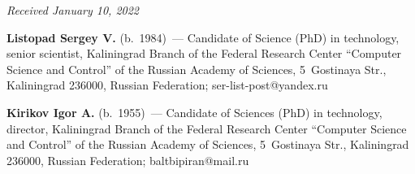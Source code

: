 \vspace*{-6pt}

\hfill{\small\textit{Received January 10, 2022}}


   
   \Contr
   
   \noindent
   \textbf{Listopad Sergey V.} (b.\ 1984)~--- Candidate of Science (PhD) in technology, senior 
scientist, Kaliningrad Branch of the Federal Research Center ``Computer Science and Control'' of 
the Russian Academy of Sciences, 5~Gostinaya Str., Kaliningrad 236000, Russian Federation;  
\mbox{ser-list-post@yandex.ru}
   
   \vspace*{3pt}
   
   \noindent
   \textbf{Kirikov Igor A.} (b.\ 1955)~--- Candidate of  Sciences (PhD) in technology, director, 
Kaliningrad Branch of the Federal Research Center ``Computer Science and Control'' of the Russian 
Academy of Sciences, 5~Gostinaya Str., Kaliningrad 236000, Russian Federation; 
\mbox{baltbipiran@mail.ru}

\label{end\stat}

\renewcommand{\bibname}{\protect\rm Литература} 
    